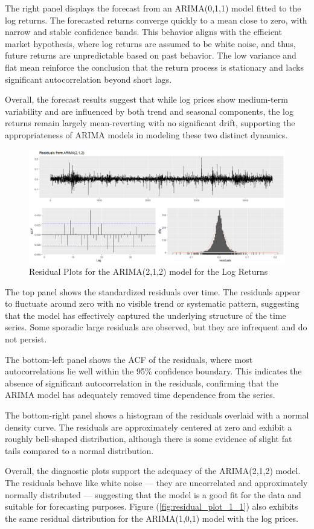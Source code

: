 The right panel displays the forecast from an ARIMA(0,1,1) model fitted to the log returns. The forecasted returns converge quickly to a mean close to zero, with narrow and stable confidence bands. This behavior aligns with the efficient market hypothesis, where log returns are assumed to be white noise, and thus, future returns are unpredictable based on past behavior. The low variance and flat mean reinforce the conclusion that the return process is stationary and lacks significant autocorrelation beyond short lags.

Overall, the forecast results suggest that while log prices show medium-term variability and are influenced by both trend and seasonal components, the log returns remain largely mean-reverting with no significant drift, supporting the appropriateness of ARIMA models in modeling these two distinct dynamics.
\begin{figure}[h]
	\centering
	\includegraphics[width=1\linewidth]{content/plots/residual_plot_212.png}
	\caption{Residual Plots for the ARIMA(2,1,2) model for the Log Returns}
	\label{fig:residual_plot_212}
\end{figure}
The top panel shows the standardized residuals over time. The residuals appear to fluctuate around zero with no visible trend or systematic pattern, suggesting that the model has effectively captured the underlying structure of the time series. Some sporadic large residuals are observed, but they are infrequent and do not persist.

The bottom-left panel shows the ACF of the residuals, where most autocorrelations lie well within the 95\% confidence boundary. This indicates the absence of significant autocorrelation in the residuals, confirming that the ARIMA model has adequately removed time dependence from the series.

The bottom-right panel shows a histogram of the residuals overlaid with a normal density curve. The residuals are approximately centered at zero and exhibit a roughly bell-shaped distribution, although there is some evidence of slight fat tails compared to a normal distribution.

Overall, the diagnostic plots support the adequacy of the ARIMA(2,1,2) model. The residuals behave like white noise — they are uncorrelated and approximately normally distributed — suggesting that the model is a good fit for the data and suitable for forecasting purposes. Figure (\ref{fig:residual_plot_1_1}) also exhibits the same residual distribution for the ARIMA(1,0,1) model with the log prices.